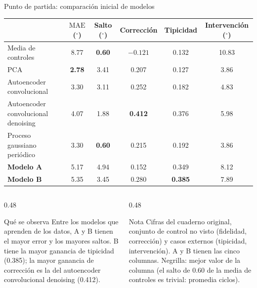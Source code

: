 \documentclass[aspectratio=169,10pt,t]{beamer}
\newcommand{\gr}{$^\circ$}
\newcommand{\mae}{\ensuremath{\mathrm{MAE}}}
\begin{document}
\begin{frame}{Punto de partida: comparación inicial de modelos}
\centering\footnotesize\setlength{\tabcolsep}{5pt}
\begin{tabular}{lccccc}
\toprule
 & \textbf{\mae{} (\gr)} & \textbf{Salto (\gr)} & \textbf{Corrección} & \textbf{Tipicidad} & \textbf{Intervención (\gr)}\\
\midrule
Media de controles & 8.77 & \textbf{0.60} & $-0.121$ & 0.132 & 10.83\\
PCA & \textbf{2.78} & 3.41 & 0.207 & 0.127 & 3.86\\
Autoencoder convolucional & 3.30 & 3.11 & 0.252 & 0.182 & 4.83\\
Autoencoder convolucional denoising & 4.07 & 1.88 & \textbf{0.412} & 0.376 & 5.98\\
Proceso gaussiano periódico & 3.30 & \textbf{0.60} & 0.215 & 0.192 & 3.86\\
\rowcolor{naranjac}\textbf{Modelo A} & 5.17 & 4.94 & 0.152 & 0.349 & 8.12\\
\rowcolor{naranjac}\textbf{Modelo B} & 5.35 & 3.45 & 0.280 & \textbf{0.385} & 7.89\\
\bottomrule
\end{tabular}

\vspace{6pt}
\begin{columns}[T]
\begin{column}{0.48\textwidth}
\begin{block}{Qué se observa}\scriptsize
Entre los modelos que aprenden de los datos, A y B tienen el mayor error y los mayores saltos. B tiene la mayor ganancia de tipicidad (0.385); la mayor ganancia de corrección es la del autoencoder convolucional denoising (0.412).
\end{block}
\end{column}
\begin{column}{0.48\textwidth}
\begin{block}{Nota}\scriptsize
Cifras del cuaderno original, conjunto de control no visto (fidelidad, corrección) y casos externos (tipicidad, intervención). A y B tienen las cinco columnas. Negrilla: mejor valor de la columna (el salto de 0.60 de la media de controles es trivial: promedia ciclos).
\end{block}
\end{column}
\end{columns}
\end{frame}
\end{document}
